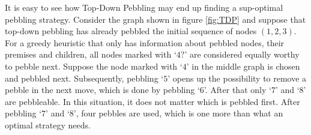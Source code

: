 \documentclass{llncs}
\begin{document}
\begin{example}
\label{example:topdown}
It is easy to see how Top-Down Pebbling may end up finding a sup-optimal pebbling strategy. Consider the graph shown in figure \ref{fig:TDP} and suppose that top-down pebbling has already pebbled the initial sequence of nodes $(1,2,3)$. 
For a greedy heuristic that only has information about pebbled nodes, their premises and children, all nodes marked with `$4?$' are considered equally worthy to pebble next.
Suppose the node marked with `$4$' in the middle graph is chosen and pebbled next.
Subsequently, pebbling `$5$' opens up the possibility to remove a pebble in the next move, which is done by pebbling `$6$'.
After that only `$7$' and `$8$' are pebbleable. In this situation, it does not matter which is pebbled first.
After pebbling `$7$' and `$8$', four pebbles are used, which is one more than what an optimal strategy needs.



\end{example}
\end{document}
